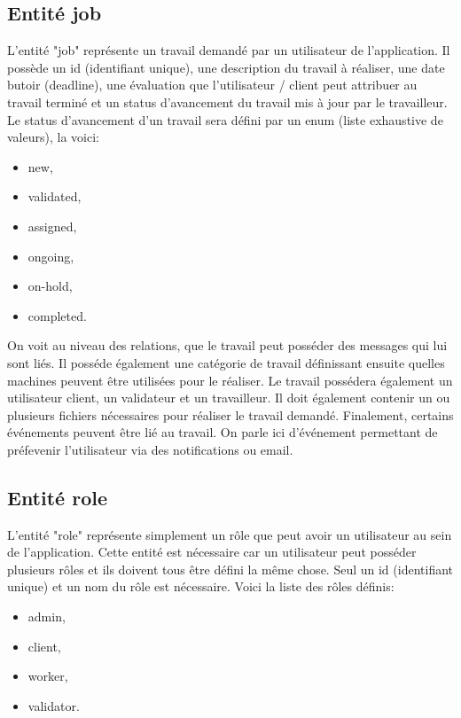 \documentclass[
    iai, %
    il, %
]{heig-tb}
\begin{document}
\subsection{Entité job}
L'entité "job" représente un travail demandé par un utilisateur de l'application.\newline
Il possède un id (identifiant unique), une description du travail à réaliser, une date butoir (deadline), une évaluation que l'utilisateur / client peut attribuer au travail terminé et un status d'avancement du travail mis à jour par le travailleur.\newline
Le status d'avancement d'un travail sera défini par un enum (liste exhaustive de valeurs), la voici:
\begin{itemize}
    \item new,
    \item validated,
    \item assigned,
    \item ongoing,
    \item on-hold,
    \item completed.
\end{itemize}

On voit au niveau des relations, que le travail peut posséder des messages qui lui sont liés.\newline
Il posséde également une catégorie de travail définissant ensuite quelles machines peuvent être utilisées pour le réaliser.\newline
Le travail possédera également un utilisateur client, un validateur et un travailleur.\newline
Il doit également contenir un ou plusieurs fichiers nécessaires pour réaliser le travail demandé.\newline
Finalement, certains événements peuvent être lié au travail. On parle ici d'événement permettant de préfevenir l'utilisateur via des notifications ou email.

\subsection{Entité role}
L'entité "role" représente simplement un rôle que peut avoir un utilisateur au sein de l'application. Cette entité est nécessaire car un utilisateur peut posséder plusieurs rôles et ils doivent tous être défini la même chose.\newline
Seul un id (identifiant unique) et un nom du rôle est nécessaire.\newline
Voici la liste des rôles définis:
\begin{itemize}
    \item admin,
    \item client,
    \item worker,
    \item validator.
\end{itemize}
\end{document}
